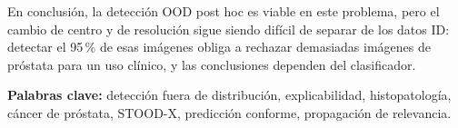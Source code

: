 En conclusión, la detección OOD post hoc es viable en este problema, pero el cambio de centro y de resolución sigue siendo difícil de separar de los datos ID: detectar el 95\,\% de esas imágenes obliga a rechazar demasiadas imágenes de próstata para un uso clínico, y las conclusiones dependen del clasificador.

\medskip
\noindent\textbf{Palabras clave:} detección fuera de distribución, explicabilidad, histopatología, cáncer de próstata, STOOD-X, predicción conforme, propagación de relevancia.

\endinput
